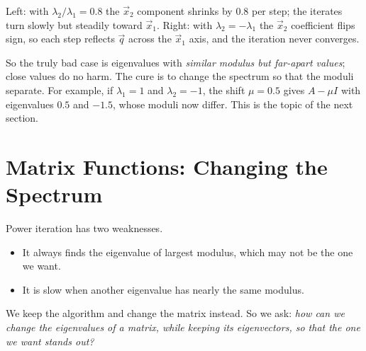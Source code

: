 \begin{center}

\small Left: with $\lambda_2/\lambda_1 = 0.8$ the $\vec{x}_2$ component shrinks by $0.8$ per step; the iterates turn slowly but steadily toward $\vec{x}_1$. Right: with $\lambda_2 = -\lambda_1$ the $\vec{x}_2$ coefficient flips sign, so each step reflects $\vec{q}$ across the $\vec{x}_1$ axis, and the iteration never converges.
\end{center}

So the truly bad case is eigenvalues with \emph{similar modulus but far-apart values}; close values do no harm. The cure is to change the spectrum so that the moduli separate. For example, if $\lambda_1 = 1$ and $\lambda_2 = -1$, the shift $\mu = 0.5$ gives $A - \mu I$ with eigenvalues $0.5$ and $-1.5$, whose moduli now differ. This is the topic of the next section.

\section{Matrix Functions: Changing the Spectrum}

Power iteration has two weaknesses.
\begin{itemize}
  \item It always finds the eigenvalue of largest modulus, which may not be the one we want.
  \item It is slow when another eigenvalue has nearly the same modulus.
\end{itemize}
We keep the algorithm and change the matrix instead. So we ask: \emph{how can we change the eigenvalues of a matrix, while keeping its eigenvectors, so that the one we want stands out?}

